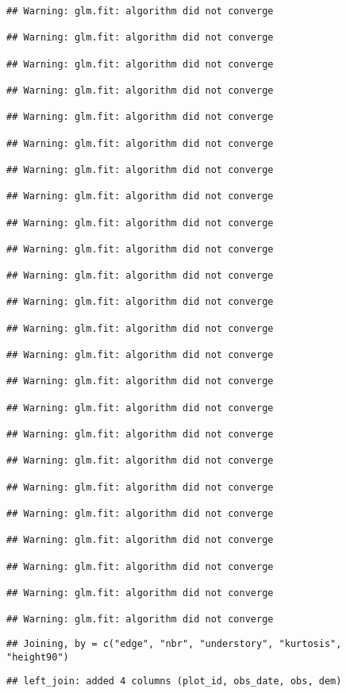 \documentclass[
]{article}
\begin{document}
\begin{verbatim}
## Warning: glm.fit: algorithm did not converge

## Warning: glm.fit: algorithm did not converge

## Warning: glm.fit: algorithm did not converge

## Warning: glm.fit: algorithm did not converge

## Warning: glm.fit: algorithm did not converge

## Warning: glm.fit: algorithm did not converge

## Warning: glm.fit: algorithm did not converge

## Warning: glm.fit: algorithm did not converge

## Warning: glm.fit: algorithm did not converge

## Warning: glm.fit: algorithm did not converge

## Warning: glm.fit: algorithm did not converge

## Warning: glm.fit: algorithm did not converge

## Warning: glm.fit: algorithm did not converge

## Warning: glm.fit: algorithm did not converge

## Warning: glm.fit: algorithm did not converge

## Warning: glm.fit: algorithm did not converge

## Warning: glm.fit: algorithm did not converge

## Warning: glm.fit: algorithm did not converge

## Warning: glm.fit: algorithm did not converge

## Warning: glm.fit: algorithm did not converge

## Warning: glm.fit: algorithm did not converge

## Warning: glm.fit: algorithm did not converge

## Warning: glm.fit: algorithm did not converge

## Warning: glm.fit: algorithm did not converge
\end{verbatim}

\begin{verbatim}
## Joining, by = c("edge", "nbr", "understory", "kurtosis", "height90")
\end{verbatim}

\begin{verbatim}
## left_join: added 4 columns (plot_id, obs_date, obs, dem)
\end{verbatim}
\end{document}
